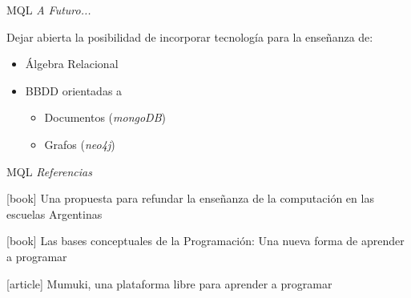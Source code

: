 \documentclass{beamer}
\begin{document}
\begin{frame}
    {MQL}
    {\emph{A Futuro...}}

    Dejar abierta la posibilidad de incorporar tecnología para la enseñanza de:

    \begin{itemize}
        \item Álgebra Relacional

        \item BBDD orientadas a

        \begin{itemize}
            \item Documentos {\footnotesize (\emph{mongoDB})}
            \item Grafos {\footnotesize (\emph{neo4j})}
        \end{itemize}

    \end{itemize}

\end{frame}





\begin{frame}
    {MQL}
    {\emph{Referencias}}

    \begin{thebibliography}{10}
      [book]
        Una propuesta para refundar la enseñanza de la computación en las escuelas Argentinas

      [book]
        Las bases conceptuales de la Programación: Una nueva forma de aprender a programar

      [article]
        Mumuki, una plataforma libre para aprender a programar
      \end{thebibliography}
\end{frame}
\end{document}
